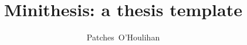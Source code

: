 \documentclass[nobind, draft, oneside]{minithesis} %
\title{
Minithesis: a thesis template
}
\author{Patches~O'Houlihan}
\begin{document}
\begin{frontmatter}

\end{frontmatter}

\begin{mainmatter}




\end{mainmatter}

\begin{appendices}

\end{appendices}

\begin{backmatter}

\end{backmatter}
\end{document}
